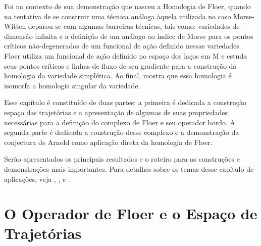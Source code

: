\documentclass[12pt]{book}
\begin{document}
	Foi no contexto de sua demonstração que nasceu a Homologia de Floer, quando na tentativa de se construir uma técnica análoga àquela utilizada no caso Morse-Witten deparou-se com algumas barreiras técnicas, tais como: variedades de dimensão infinita e a definição de um análogo ao índice de Morse para os pontos críticos não-degenerados de um funcional de ação definido nessas variedades. Floer utiliza um funcional de ação definido no espaço dos laços em M e estuda seus pontos críticos e linhas de fluxo de seu gradiente para a construção da homologia da variedade simplética. Ao final, mostra que essa homologia é isomorfa a homologia singular da variedade.
	
	Esse capítulo é constituído de duas partes: a primeira é dedicada a construção espaço das trajetórias e a apresentação de algumas de suas propriedades necessárias para a definição do complexo de Floer e seu operador bordo. A segunda parte é dedicada a construção desse complexo e a demonstração da conjectura de Arnold como aplicação direta da homologia de Floer. 
	
	Serão apresentados os principais resultados e o roteiro para as construções e demonstrações mais importantes. Para detalhes sobre os temas desse capítulo de aplicações, veja \cite{audi_floer_homology}, \cite{salamon_lecture},  \cite{salamon_conley_index} e \cite{salamon_zehnder}.
	
	
	\section{O Operador de Floer e o Espaço de Trajetórias}\label{apendice_variedades_banach}
	
\end{document}
